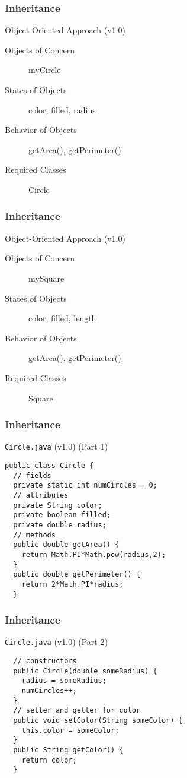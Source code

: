 \documentclass[10pt, compress]{beamer}
\begin{document}
\begin{frame}[fragile]
  \frametitle{Inheritance}
  \begin{block}{Object-Oriented Approach (v1.0)}
  \begin{description}
    \item[Objects of Concern] myCircle
    \item[States of Objects] color, filled, radius
    \item[Behavior of Objects] getArea(), getPerimeter()
    \item[Required Classes] Circle
  \end{description}
  \end{block}
\end{frame}

\begin{frame}[fragile]
  \frametitle{Inheritance}
  \begin{block}{Object-Oriented Approach (v1.0)}
  \begin{description}
    \item[Objects of Concern] mySquare
    \item[States of Objects] color, filled, length
    \item[Behavior of Objects] getArea(), getPerimeter()
    \item[Required Classes] Square
  \end{description}
  \end{block}
\end{frame}

\begin{frame}[fragile]
  \frametitle{Inheritance}
  \begin{block}{\texttt{Circle.java} (v1.0) (Part 1)}
    \begin{verbatim}
public class Circle {
  // fields
  private static int numCircles = 0;
  // attributes
  private String color;
  private boolean filled;
  private double radius;
  // methods
  public double getArea() {
    return Math.PI*Math.pow(radius,2);
  }
  public double getPerimeter() {
    return 2*Math.PI*radius;
  }
    \end{verbatim}
  \end{block}
\end{frame}

\begin{frame}[fragile]
  \frametitle{Inheritance}
  \begin{block}{\texttt{Circle.java} (v1.0) (Part 2)}
    \begin{verbatim}
  // constructors
  public Circle(double someRadius) {
    radius = someRadius;
    numCircles++;
  }
  // setter and getter for color
  public void setColor(String someColor) {
    this.color = someColor;
  }
  public String getColor() {
    return color;
  }
    \end{verbatim}
  \end{block}
\end{frame}
\end{document}
